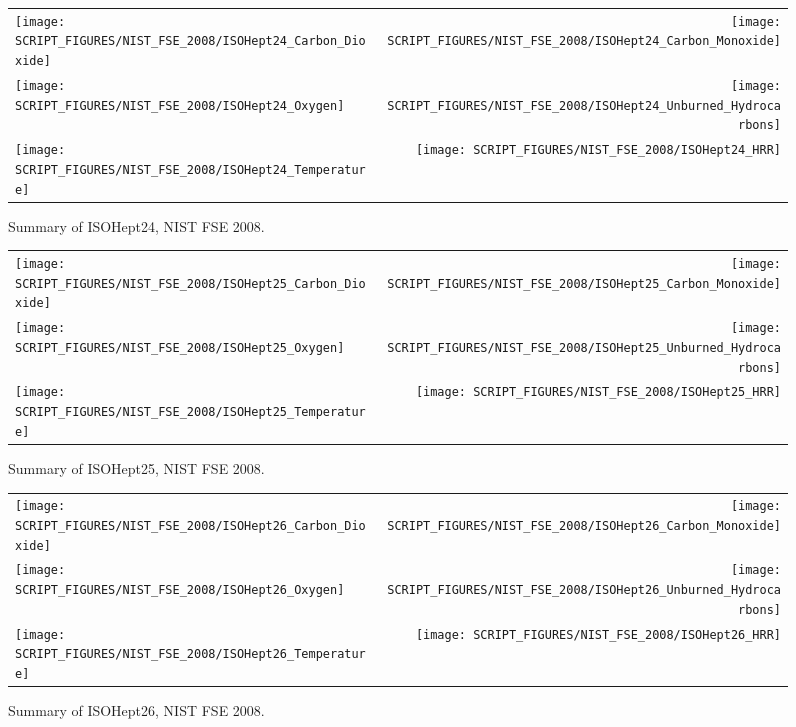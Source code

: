 \begin{figure}[p]
\begin{tabular*}{\textwidth}{l@{\extracolsep{\fill}}r}
\texttt{[image: SCRIPT\_FIGURES/NIST\_FSE\_2008/ISOHept24\_Carbon\_Dioxide]} &
\texttt{[image: SCRIPT\_FIGURES/NIST\_FSE\_2008/ISOHept24\_Carbon\_Monoxide]} \\
\texttt{[image: SCRIPT\_FIGURES/NIST\_FSE\_2008/ISOHept24\_Oxygen]} &
\texttt{[image: SCRIPT\_FIGURES/NIST\_FSE\_2008/ISOHept24\_Unburned\_Hydrocarbons]} \\
\texttt{[image: SCRIPT\_FIGURES/NIST\_FSE\_2008/ISOHept24\_Temperature]} &
\texttt{[image: SCRIPT\_FIGURES/NIST\_FSE\_2008/ISOHept24\_HRR]}
\end{tabular*}
\caption[Summary of ISOHept24, NIST FSE 2008]{Summary of ISOHept24, NIST FSE 2008.}
\label{NIST_FSE_1994_ISOHept24}
\end{figure}

\begin{figure}[p]
\begin{tabular*}{\textwidth}{l@{\extracolsep{\fill}}r}
\texttt{[image: SCRIPT\_FIGURES/NIST\_FSE\_2008/ISOHept25\_Carbon\_Dioxide]} &
\texttt{[image: SCRIPT\_FIGURES/NIST\_FSE\_2008/ISOHept25\_Carbon\_Monoxide]} \\
\texttt{[image: SCRIPT\_FIGURES/NIST\_FSE\_2008/ISOHept25\_Oxygen]} &
\texttt{[image: SCRIPT\_FIGURES/NIST\_FSE\_2008/ISOHept25\_Unburned\_Hydrocarbons]} \\
\texttt{[image: SCRIPT\_FIGURES/NIST\_FSE\_2008/ISOHept25\_Temperature]} &
\texttt{[image: SCRIPT\_FIGURES/NIST\_FSE\_2008/ISOHept25\_HRR]}
\end{tabular*}
\caption[Summary of ISOHept25, NIST FSE 2008]{Summary of ISOHept25, NIST FSE 2008.}
\label{NIST_FSE_1994_ISOHept25}
\end{figure}

\begin{figure}[p]
\begin{tabular*}{\textwidth}{l@{\extracolsep{\fill}}r}
\texttt{[image: SCRIPT\_FIGURES/NIST\_FSE\_2008/ISOHept26\_Carbon\_Dioxide]} &
\texttt{[image: SCRIPT\_FIGURES/NIST\_FSE\_2008/ISOHept26\_Carbon\_Monoxide]} \\
\texttt{[image: SCRIPT\_FIGURES/NIST\_FSE\_2008/ISOHept26\_Oxygen]} &
\texttt{[image: SCRIPT\_FIGURES/NIST\_FSE\_2008/ISOHept26\_Unburned\_Hydrocarbons]} \\
\texttt{[image: SCRIPT\_FIGURES/NIST\_FSE\_2008/ISOHept26\_Temperature]} &
\texttt{[image: SCRIPT\_FIGURES/NIST\_FSE\_2008/ISOHept26\_HRR]}
\end{tabular*}
\caption[Summary of ISOHept26, NIST FSE 2008]{Summary of ISOHept26, NIST FSE 2008.}
\label{NIST_FSE_1994_ISOHept26}
\end{figure}

